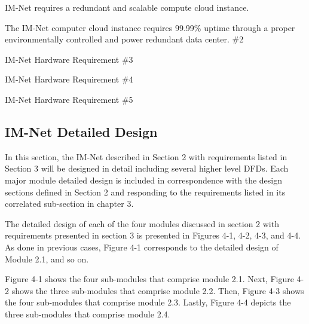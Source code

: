 \documentclass[letterpaper,12pt]{article}
\newcounter{qcounter}						%
\newcommand{\Section}[1]{\section{#1} \setcounter{figure}{0}}
\begin{document}
{\begin{list}{H -- :~}{}

\item  IM-Net requires a redundant and scalable compute cloud instance.

\item  The IM-Net computer cloud instance requires 99.99\% uptime through a proper environmentally controlled and power redundant data center. \#2

\item  IM-Net Hardware Requirement \#3

\item  IM-Net Hardware Requirement \#4

\item  IM-Net Hardware Requirement \#5

\end{list}

\eject

\textcolor{section}{\Section{IM-Net Detailed Design}}

In this section, the IM-Net described in Section 2 with requirements listed in Section 3 will be designed in detail including several higher level DFDs. Each major module detailed design is included in correspondence with the design sections defined in Section 2 and responding to the requirements listed in its correlated sub-section in chapter 3.

The detailed design of each of the four modules discussed in section 2 with requirements presented in section 3 is presented in Figures 4-1, 4-2, 4-3, and 4-4. As done in previous cases, Figure 4-1 corresponds to the detailed design of Module 2.1, and so on.

Figure 4-1 shows the four sub-modules that comprise module 2.1. Next, Figure 4-2 shows the three sub-modules that comprise module 2.2. Then, Figure 4-3 shows the four sub-modules that comprise module 2.3. Lastly, Figure 4-4 depicts the three sub-modules that comprise module 2.4.

}
\end{document}
